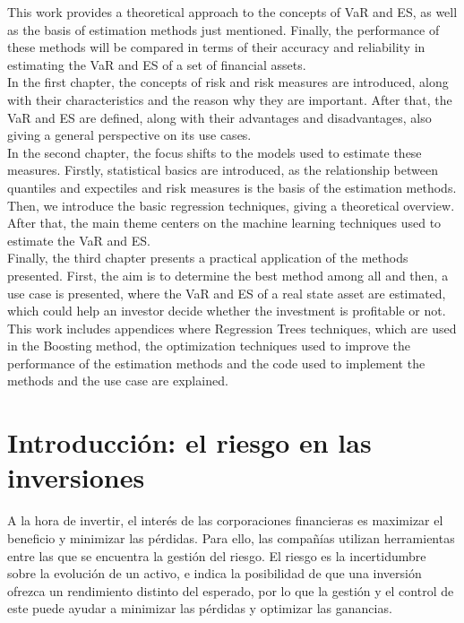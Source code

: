 \documentclass[11pt]{book}
\newcommand{\clearemptydoublepage}{\newpage{\pagestyle{empty}\cleardoublepage}}
\theoremstyle{plain} %
\theoremstyle{definition} %
\begin{document}
This work provides a theoretical approach to the concepts of VaR and ES,
as well as the basis of estimation methods just mentioned. Finally, 
the performance of these methods will be compared in terms of their
accuracy and reliability in estimating the VaR and ES of a set of
financial assets. \\

In the first chapter, the concepts of risk and risk measures are introduced, 
along with their characteristics and the reason why they are important. After 
that, the VaR and ES are defined, along with their advantages and
disadvantages, also giving a general perspective on its use cases.\\

In the second chapter, the focus shifts to the models used to estimate 
these measures. Firstly, statistical basics are introduced, as the 
relationship between quantiles and expectiles and risk measures 
is the basis of the estimation methods. Then, we introduce the basic 
regression techniques, giving a theoretical overview. After that, 
the main theme centers on the machine learning techniques used to 
estimate the VaR and ES. \\

Finally, the third chapter presents a practical application of the 
methods presented. First, the aim is to determine the best 
method among all and then, a use case is presented, where the 
VaR and ES of a real state asset are estimated, which could help an investor decide whether the investment is profitable or not. \\

This work includes appendices where Regression Trees 
techniques, which are used in the Boosting method, the optimization 
techniques used to improve the performance of the estimation methods and 
the code used to implement the methods and the use case are explained.\\

\clearemptydoublepage

\tableofcontents

\clearemptydoublepage

\mainmatter                      %
\pagestyle{miestilo}    %

\chapter{Introducción: el riesgo en las inversiones}
A la hora de invertir, el interés de las corporaciones financieras es maximizar 
el beneficio y minimizar las pérdidas. Para ello, las compañías utilizan 
herramientas entre las que se encuentra la gestión del riesgo. El riesgo 
es la incertidumbre sobre la evolución de un activo, e indica la posibilidad 
de que una inversión ofrezca un rendimiento distinto del esperado, por lo 
que la gestión y el control de este puede ayudar a minimizar las pérdidas y 
optimizar las ganancias.\\
\end{document}
